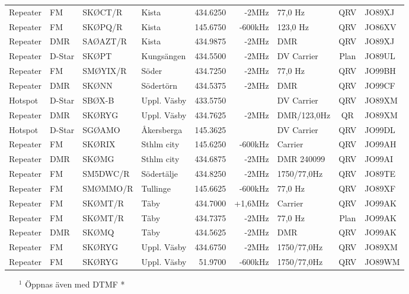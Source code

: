 \begin{landscape}
\begin{longtable}{llllrrlcl}
Repeater & FM     & SKØCT/R  & Kista       & 434.6250  & -2MHz   & 77,0 Hz        & QRV  & JO89XJ \\
Repeater & FM     & SKØPQ/R  & Kista       & 145.6750  & -600kHz & 123,0 Hz       & QRV  & JO86XV \\
Repeater & DMR    & SAØAZT/R & Kista       & 434.9875  & -2MHz   & DMR            & QRV  & JO89XJ \\
Repeater & D-Star & SKØPT    & Kungsängen  & 434.5500  & -2MHz   & DV Carrier     & Plan & JO89UL \\
Repeater & FM     & SMØYIX/R & Söder       & 434.7250  & -2MHz   & 77,0 Hz        & QRV  & JO99BH \\
Repeater & DMR    & SKØNN    & Södertörn   & 434.5375  & -2MHz   & DMR            & QRV  & JO99CF \\
Hotspot  & D-Star & SBØX-B   & Uppl. Väsby & 433.5750  &         & DV Carrier     & QRV  & JO89XM \\
Repeater & DMR    & SKØRYG   & Uppl. Väsby & 434.7625  & -2MHz   & DMR/123,0Hz    & QR   & JO89XM \\
Hotspot  & D-Star & SGØAMO   & Åkersberga  & 145.3625  &         & DV Carrier     & QRV  & JO99DL \\
Repeater & FM     & SKØRIX   & Sthlm city  & 145.6250  & -600kHz & Carrier        & QRV  & JO99AH \\
Repeater & DMR    & SKØMG    & Sthlm city  & 434.6875  & -2MHz   & DMR 240099     & QRV  & JO99AI \\
Repeater & FM     & SM5DWC/R & Södertälje  & 434.8250  & -2MHz   & 1750/77,0Hz    & QRV  & JO89TE \\
Repeater & FM     & SMØMMO/R & Tullinge    & 145.6625  & -600kHz & 77,0 Hz        & QRV  & JO89XF \\
Repeater & FM     & SKØMT/R  & Täby        & 434.7000  & +1,6MHz & Carrier        & QRV  & JO99AK \\
Repeater & FM     & SKØMT/R  & Täby        & 434.7375  & -2MHz   & 77,0 Hz        & Plan & JO99AK \\
Repeater & DMR    & SKØMQ    & Täby        & 434.5625  & -2MHz   & DMR            & QRV  & JO99AK \\
Repeater & FM     & SKØRYG   & Uppl. Väsby & 434.6750  & -2MHz   & 1750/77,0Hz    & QRV  & JO89XM \\
Repeater & FM     & SKØRYG   & Uppl. Väsby & 51.9700   & -600kHz & 1750/77,0Hz    & QRV  & JO89WM
\end{longtable}
\begin{itemize}
	\item[$^1$] Öppnas även med DTMF *
\end{itemize}
\normalsize


\end{landscape}
